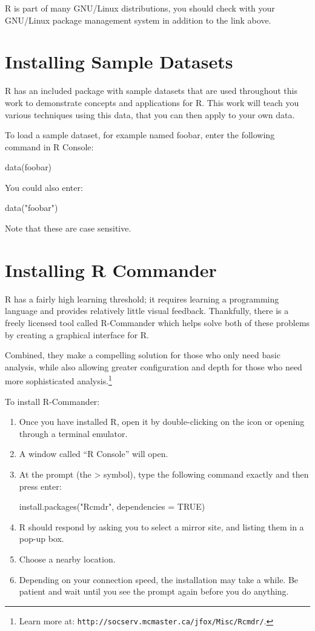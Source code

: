 R is part of many GNU/Linux distributions, you should check with your GNU/Linux package management system in addition to the link above.

\section{Installing Sample Datasets}
R has an included package with sample datasets that are used throughout this work to demonstrate concepts and applications for R. This work will teach you various techniques using this data, that you can then apply to your own data.

To load a sample dataset, for example named foobar, enter the following command in R Console:

data(foobar)

You could also enter:

data("foobar")

Note that these are case sensitive.

\section{Installing R Commander}
R has a fairly high learning threshold; it requires learning a programming language and provides relatively little visual feedback. Thankfully, there is a freely licensed tool called R-Commander which helps solve both of these problems by creating a graphical interface for R.

Combined, they make a compelling solution for those who only need basic analysis, while also allowing greater configuration and depth for those who need more sophisticated analysis.\footnote{Learn more at: \texttt{http://socserv.mcmaster.ca/jfox/Misc/Rcmdr/}.}

To install R-Commander:

\begin{enumerate}
 \item Once you have installed R, open it by double-clicking on the icon or opening through a terminal emulator.
 \item A window called “R Console” will open.
 \item At the prompt (the > symbol), type the following command exactly and then press enter:

install.packages("Rcmdr", dependencies = TRUE)

 \item R should respond by asking you to select a mirror site, and listing them in a pop-up box.
 \item Choose a nearby location.
 \item Depending on your connection speed, the installation may take a while. Be patient and wait until you see the prompt again before you do anything.
 \end{enumerate}
 
